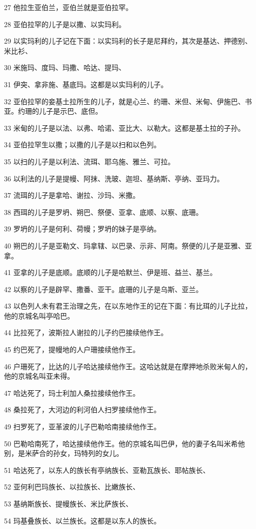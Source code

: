 \par 27 他拉生亚伯兰，亚伯兰就是亚伯拉罕。
\par 28 亚伯拉罕的儿子是以撒、以实玛利。
\par 29 以实玛利的儿子记在下面：以实玛利的长子是尼拜约，其次是基达、押德别、米比衫、
\par 30 米施玛、度玛、玛撒、哈达、提玛、
\par 31 伊突、拿非施、基底玛。这都是以实玛利的儿子。
\par 32 亚伯拉罕的妾基土拉所生的儿子，就是心兰、约珊、米但、米甸、伊施巴、书亚。约珊的儿子是示巴、底但。
\par 33 米甸的儿子是以法、以弗、哈诺、亚比大、以勒大。这都是基土拉的子孙。
\par 34 亚伯拉罕生以撒；以撒的儿子是以扫和以色列。
\par 35 以扫的儿子是以利法、流珥、耶乌施、雅兰、可拉。
\par 36 以利法的儿子是提幔、阿抹、洗玻、迦坦、基纳斯、亭纳、亚玛力。
\par 37 流珥的儿子是拿哈、谢拉、沙玛、米撒。
\par 38 西珥的儿子是罗坍、朔巴、祭便、亚拿、底顺、以察、底珊。
\par 39 罗坍的儿子是何利、荷幔；罗坍的妹子是亭纳。
\par 40 朔巴的儿子是亚勒文、玛拿辖、以巴录、示非、阿南。祭便的儿子是亚雅、亚拿。
\par 41 亚拿的儿子是底顺。底顺的儿子是哈默兰、伊是班、益兰、基兰。
\par 42 以察的儿子是辟罕、撒番、亚干。底珊的儿子是乌斯、亚兰。
\par 43 以色列人未有君王治理之先，在以东地作王的记在下面：有比珥的儿子比拉，他的京城名叫亭哈巴。
\par 44 比拉死了，波斯拉人谢拉的儿子约巴接续他作王。
\par 45 约巴死了，提幔地的人户珊接续他作王。
\par 46 户珊死了，比达的儿子哈达接续他作王。这哈达就是在摩押地杀败米甸人的，他的京城名叫亚未得。
\par 47 哈达死了，玛士利加人桑拉接续他作王。
\par 48 桑拉死了，大河边的利河伯人扫罗接续他作王。
\par 49 扫罗死了，亚革波的儿子巴勒哈南接续他作王。
\par 50 巴勒哈南死了，哈达接续他作王。他的京城名叫巴伊，他的妻子名叫米希他别，是米萨合的孙女，玛特列的女儿。
\par 51 哈达死了，以东人的族长有亭纳族长、亚勒瓦族长、耶帖族长、
\par 52 亚何利巴玛族长、以拉族长、比嫩族长、
\par 53 基纳斯族长、提幔族长、米比萨族长、
\par 54 玛基叠族长、以兰族长。这都是以东人的族长。


